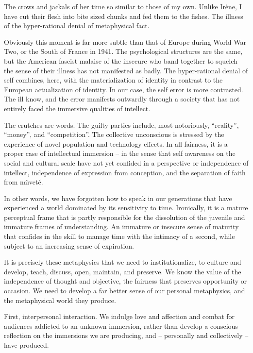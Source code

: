 The crows and jackals of her time so similar to those of my own.
Unlike Ir\`{e}ne, I have cut their flesh into bite sized chunks and
fed them to the fishes.  The illness of the hyper-rational denial of
metaphysical fact.

Obviously this moment is far more subtle than that of Europe during
World War Two, or the South of \break France in 1941.  The psychological
structures are the same, but the American fascist malaise of the
insecure who band together to squelch the sense of their illness has
not manifested as badly.  The hyper-rational denial of self combines,
here, with the materialization of identity in contrast to the European
actualization of identity.  In our case, the self error is more
contrasted.  The ill know, and the error manifests outwardly through a
society that has not entirely faced the immersive qualities of
intellect.

The crutches are words.  The guilty parties include, most notoriously,
``reality'', ``money'', and \break ``competition''.  The collective
unconscious is stressed by the experience of novel population and
technology effects.  In all fairness, it is a proper case of
intellectual immersion -- in the sense that self awareness on the
social and cultural scale have not yet confided in a perspective or
independence of intellect, independence of expression from conception,
and the separation of faith from na\"{\i}vet\'{e}.

In other words, we have forgotten how to speak in our generations that
have experienced a world dominated by its sensitivity to time.
Ironically, it is a mature perceptual frame that is partly responsible
for the dissolution of the juvenile and immature frames of
understanding.  An immature or insecure sense of maturity that
confides in the skill to manage time with the intimacy of a second,
while subject to an increasing sense of expiration.

It is precisely these metaphysics that we need to institutionalize, to
culture and develop, teach, discuss, open, maintain, and preserve.  We
know the value of the independence of thought and objective, the
fairness that preserves opportunity or occasion.  We need to develop a
far better sense of our personal metaphysics, and the metaphysical
world they produce.

First, interpersonal interaction.  We indulge love and affection and
combat for audiences addicted to an unknown immersion, rather than
develop a conscious reflection on the immersions we are producing, and
-- personally and collectively -- have produced.

